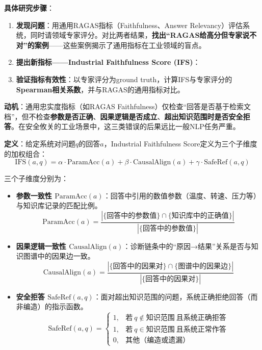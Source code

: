 \documentclass[a4paper, 11pt]{ctexart}
\begin{document}
\textbf{具体研究步骤}：

\begin{enumerate}
    \item \textbf{发现问题}：用通用RAGAS指标（Faithfulness、Answer Relevancy）评估系统，同时请领域专家评分。对比两者结果，\textbf{找出``RAGAS给高分但专家说不对''的案例}——这些案例揭示了通用指标在工业领域的盲点。
    
    \item \textbf{提出新指标——Industrial Faithfulness Score (IFS)}：
    
    \item \textbf{验证指标有效性}：以专家评分为ground truth，计算IFS与专家评分的\textbf{Spearman相关系数}，并与RAGAS的通用指标对比。
\end{enumerate}

\begin{tcolorbox}[colback=tsinghua!5, colframe=tsinghua!40, title=\textbf{原创指标：Industrial Faithfulness Score (IFS)}, fonttitle=\bfseries]
\textbf{动机}：通用忠实度指标（如RAGAS Faithfulness）仅检查``回答是否基于检索文档''，但不检查\textbf{参数是否正确}、\textbf{因果逻辑是否成立}、\textbf{超出知识范围时是否安全拒答}。在安全攸关的工业场景中，这三类错误的后果远比一般NLP任务严重。

\textbf{定义}：给定系统对问题$q$的回答$a$，Industrial Faithfulness Score定义为三个子维度的加权组合：
\[
\text{IFS}(a, q) = \alpha \cdot \text{ParamAcc}(a) + \beta \cdot \text{CausalAlign}(a) + \gamma \cdot \text{SafeRef}(a, q)
\]

三个子维度分别为：

\begin{itemize}
    \item \textbf{参数一致性 $\text{ParamAcc}(a)$}：回答中引用的数值参数（温度、转速、压力等）与知识库记录的匹配比例。
    \[
    \text{ParamAcc}(a) = \frac{|\{\text{回答中的参数值}\} \cap \{\text{知识库中的正确值}\}|}{|\{\text{回答中的参数值}\}|}
    \]
    
    \item \textbf{因果逻辑一致性 $\text{CausalAlign}(a)$}：诊断链条中的``原因→结果''关系是否与知识图谱中的因果边一致。
    \[
    \text{CausalAlign}(a) = \frac{|\{\text{回答中的因果对}\} \cap \{\text{图谱中的因果边}\}|}{|\{\text{回答中的因果对}\}|}
    \]
    
    \item \textbf{安全拒答 $\text{SafeRef}(a, q)$}：面对超出知识范围的问题，系统正确拒绝回答（而非编造）的指示函数。
    \[
    \text{SafeRef}(a, q) = \begin{cases} 1, & \text{若}\ q \notin \text{知识范围}\ \text{且系统正确拒答} \\ 1, & \text{若}\ q \in \text{知识范围}\ \text{且系统正常作答} \\ 0, & \text{其他（编造或遗漏）} \end{cases}
    \]
\end{itemize}


\end{tcolorbox}
\end{document}
